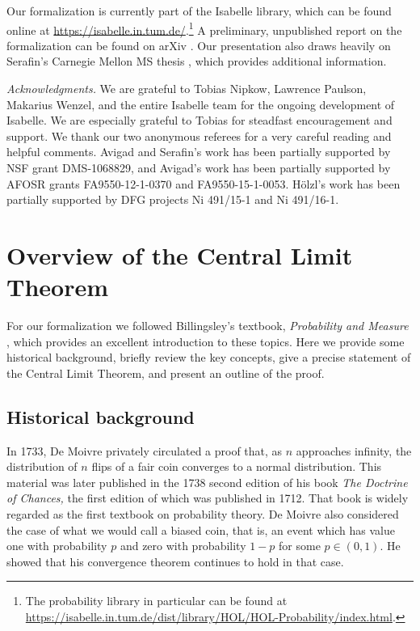 \documentclass{svjour3}
\begin{document}
Our formalization is currently part of the Isabelle library, which can be found online at \url{https://isabelle.in.tum.de/}.\footnote{The probability library in particular can be found at \url{https://isabelle.in.tum.de/dist/library/HOL/HOL-Probability/index.html}.} A preliminary, unpublished report on the formalization can be found on arXiv \cite{avigad:hoelzl:serafin:14}. Our presentation also draws heavily on Serafin's Carnegie Mellon MS thesis \cite{serafin:15}, which provides additional information.

\emph{Acknowledgments.} We are grateful to Tobias Nipkow, Lawrence Paulson, Makarius Wenzel, and the entire Isabelle team for the ongoing development of Isabelle. We are especially grateful to Tobias for steadfast encouragement and support. We thank our two anonymous referees for a very careful reading and helpful comments. Avigad and Serafin's work has been partially supported by NSF grant DMS-1068829, and Avigad's work has been partially supported by AFOSR grants FA9550-12-1-0370 and FA9550-15-1-0053. H\"olzl's work has been partially supported by DFG projects Ni 491/15-1 and Ni 491/16-1.

\section{Overview of the Central Limit Theorem}
\label{section:overview}

For our formalization we followed Billingsley's textbook, \emph{Probability and Measure} \cite{billingsley:95}, which provides an excellent introduction to these topics. Here we provide some historical background, briefly review the key concepts, give a precise statement of the Central Limit Theorem, and present an outline of the proof.

\subsection{Historical background}
\label{subsection:historical}

In 1733, De Moivre privately circulated a proof that, as $n$ approaches infinity, the distribution of $n$ flips of a fair coin converges to a normal distribution. This material was later published in the 1738 second edition of his book {\em The Doctrine of Chances,} the first edition of which was published in 1712. That book is widely regarded as the first textbook on probability theory. De Moivre also considered the case of what we would call a biased coin, that is, an event which has value one with probability $p$ and zero with probability $1-p$ for some $p \in (0,1)$. He showed that his convergence theorem continues to hold in that case.
\end{document}
